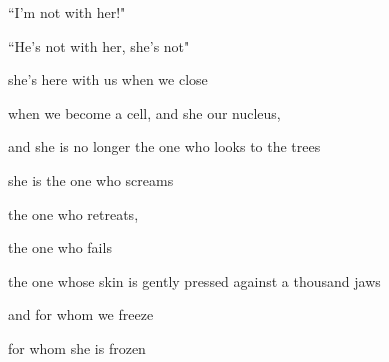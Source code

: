 \documentclass[11pt]{article}
\begin{document}
\begingroup
\begin{center}
``I'm not with her!"
\end{center}
\endgroup

\begingroup
\begin{center}
``He's not with her, she's not"
\end{center}
\endgroup

\vspace*{2\baselineskip}

\begingroup
\begin{center}
she's here with us when we close
\rightskip\leftskip
\end{center}
\endgroup

\begingroup
\begin{center}
when we become a cell, and she our nucleus,
\rightskip\leftskip
\end{center}
\endgroup

\begingroup
\begin{center}
and she is no longer the one who looks to the trees
\rightskip\leftskip
\end{center}
\endgroup

\begingroup
\begin{center}
she is the one who screams
\rightskip\leftskip
\end{center}
\endgroup

\begingroup
\begin{center}
the one who retreats,
\rightskip\leftskip
\end{center}
\endgroup

\begingroup
\begin{center}
the one who fails
\rightskip\leftskip
\end{center}
\endgroup

\begingroup
\begin{center}
the one whose skin is gently pressed against a thousand jaws
\rightskip\leftskip
\end{center}
\endgroup

\begingroup
\begin{center}
and for whom we freeze
\rightskip\leftskip
\end{center}
\endgroup

\begingroup
\begin{center}
for whom she is frozen
\rightskip\leftskip
\end{center}
\endgroup
\end{document}
